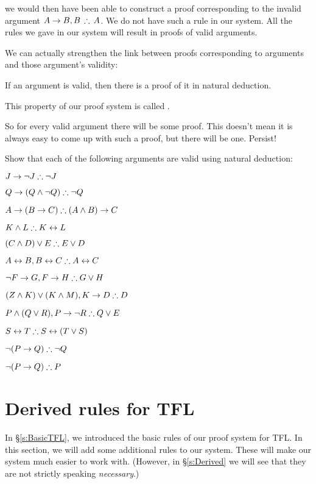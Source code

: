 	we would then have been able to construct a proof corresponding to the invalid argument $A\eif B, B\,\therefore\, A$.
We do not have such a rule in our system. All the rules we gave in our system will result in proofs of valid arguments.


We can actually strengthen the link between proofs corresponding to arguments and those argument's validity:
\begin{highlighted}
If an argument is valid, then there is a proof of it in natural deduction.
\end{highlighted}
This property of our proof system is called .

So for every valid argument there will be some proof. This doesn't mean it is always easy to come up with such a proof, but there will be one. Persist!






\begin{practiceproblems}

\problempart
\label{pr.solvedTFLproofs}
Show that each of the following arguments are valid using natural deduction:
\begin{earg}
\item $J\eif\enot J \therefore \enot J$
\item $Q\eif(Q\eand\enot Q) \therefore \enot Q$
\item $A\eif (B\eif C) \therefore (A\eand B)\eif C$
\item $K\eand L \therefore K\eiff L$
\item $(C\eand D)\eor E \therefore E\eor D$
\item $A\eiff B, B\eiff C \therefore A\eiff C$
\item $\enot F\eif G, F\eif H \therefore G\eor H$
\item $(Z\eand K) \eor (K\eand M), K \eif D \therefore D$
\item $P \eand (Q\eor R), P\eif \enot R \therefore Q\eor E$
\item $S\eiff T \therefore S\eiff (T\eor S)$
\item $\enot (P \eif Q) \therefore \enot Q$
\item $\enot (P \eif Q) \therefore P$
\end{earg}



\end{practiceproblems}



\chapter{Derived rules for TFL}\label{s:Further}
In \S\ref{s:BasicTFL}, we introduced the basic rules of our proof system for TFL. In this section, we will add some additional rules to our system. These will make our system much easier to work with. (However, in \S\ref{s:Derived} we will see that they are not strictly speaking \emph{necessary}.)

